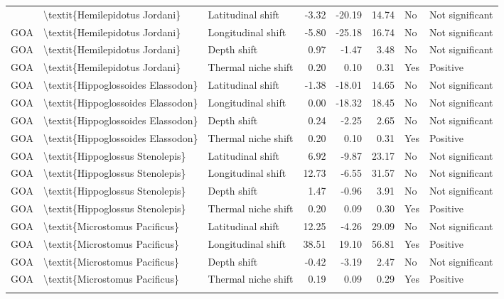 \begin{longtable}[t]{lllrrrll}
{{GOA & \textbackslash{}textit\{Hemilepidotus Jordani\} & Latitudinal shift & -3.32 & -20.19 & 14.74 & No & Not significant\\
GOA & \textbackslash{}textit\{Hemilepidotus Jordani\} & Longitudinal shift & -5.80 & -25.18 & 16.74 & No & Not significant\\
GOA & \textbackslash{}textit\{Hemilepidotus Jordani\} & Depth shift & 0.97 & -1.47 & 3.48 & No & Not significant\\
\addlinespace
GOA & \textbackslash{}textit\{Hemilepidotus Jordani\} & Thermal niche shift & 0.20 & 0.10 & 0.31 & Yes & Positive\\
GOA & \textbackslash{}textit\{Hippoglossoides Elassodon\} & Latitudinal shift & -1.38 & -18.01 & 14.65 & No & Not significant\\
GOA & \textbackslash{}textit\{Hippoglossoides Elassodon\} & Longitudinal shift & 0.00 & -18.32 & 18.45 & No & Not significant\\
GOA & \textbackslash{}textit\{Hippoglossoides Elassodon\} & Depth shift & 0.24 & -2.25 & 2.65 & No & Not significant\\
GOA & \textbackslash{}textit\{Hippoglossoides Elassodon\} & Thermal niche shift & 0.20 & 0.10 & 0.31 & Yes & Positive\\
\addlinespace
GOA & \textbackslash{}textit\{Hippoglossus Stenolepis\} & Latitudinal shift & 6.92 & -9.87 & 23.17 & No & Not significant\\
GOA & \textbackslash{}textit\{Hippoglossus Stenolepis\} & Longitudinal shift & 12.73 & -6.55 & 31.57 & No & Not significant\\
GOA & \textbackslash{}textit\{Hippoglossus Stenolepis\} & Depth shift & 1.47 & -0.96 & 3.91 & No & Not significant\\
GOA & \textbackslash{}textit\{Hippoglossus Stenolepis\} & Thermal niche shift & 0.20 & 0.09 & 0.30 & Yes & Positive\\
GOA & \textbackslash{}textit\{Microstomus Pacificus\} & Latitudinal shift & 12.25 & -4.26 & 29.09 & No & Not significant\\
\addlinespace
GOA & \textbackslash{}textit\{Microstomus Pacificus\} & Longitudinal shift & 38.51 & 19.10 & 56.81 & Yes & Positive\\
GOA & \textbackslash{}textit\{Microstomus Pacificus\} & Depth shift & -0.42 & -3.19 & 2.47 & No & Not significant\\
GOA & \textbackslash{}textit\{Microstomus Pacificus\} & Thermal niche shift & 0.19 & 0.09 & 0.29 & Yes & Positive\\
}}
\end{longtable}
